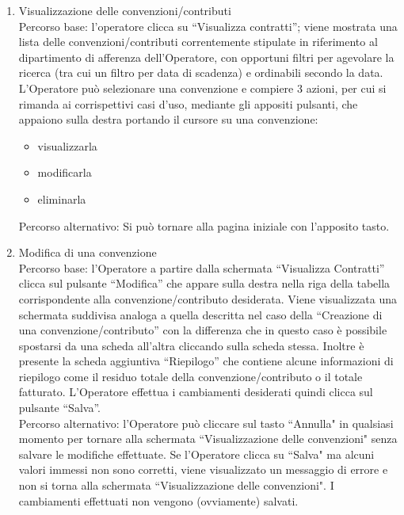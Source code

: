 \begin{enumerate}
  \item Visualizzazione delle convenzioni/contributi\\

  Percorso base:
  l'operatore clicca su ``Visualizza contratti''; viene mostrata una lista delle convenzioni/contributi correntemente stipulate in 
  riferimento al dipartimento di afferenza dell'Operatore, con opportuni filtri 
  per agevolare la ricerca (tra cui un filtro per data di scadenza) e ordinabili secondo la data.
  L'Operatore può selezionare una convenzione e compiere 3 azioni, per cui si rimanda ai corrispettivi casi d'uso, mediante gli appositi pulsanti, che appaiono sulla destra portando il cursore su 
  una convenzione:
  \begin{itemize}
   \item visualizzarla
   \item modificarla
   \item eliminarla
  \end{itemize}		

  Percorso alternativo:
  Si può tornare alla pagina iniziale con l'apposito tasto.
 
  \item Modifica di una convenzione\\
  
  Percorso base:
  l'Operatore a partire dalla schermata ``Visualizza Contratti'' clicca sul pulsante ``Modifica'' che appare sulla destra nella riga 
  della tabella corrispondente alla convenzione/contributo desiderata. Viene visualizzata una schermata suddivisa analoga a quella
  descritta nel caso della ``Creazione di una convenzione/contributo'' con la differenza che in questo caso è possibile spostarsi da una scheda all'altra
  cliccando sulla scheda stessa. Inoltre è presente la scheda aggiuntiva ``Riepilogo'' che contiene alcune informazioni di riepilogo come il residuo
  totale della convenzione/contributo o il totale fatturato.
  L'Operatore effettua i cambiamenti desiderati quindi clicca sul pulsante ``Salva''.\\

  Percorso alternativo:
  l'Operatore può cliccare sul tasto ``Annulla" in qualsiasi momento per tornare alla schermata ``Visualizzazione delle convenzioni" senza salvare le modifiche effettuate.
  Se l'Operatore clicca su ``Salva" ma alcuni valori immessi non sono corretti, viene visualizzato un messaggio di errore e non si torna alla schermata ``Visualizzazione delle
  convenzioni". I cambiamenti effettuati non vengono (ovviamente) salvati.
  

\end{enumerate}
